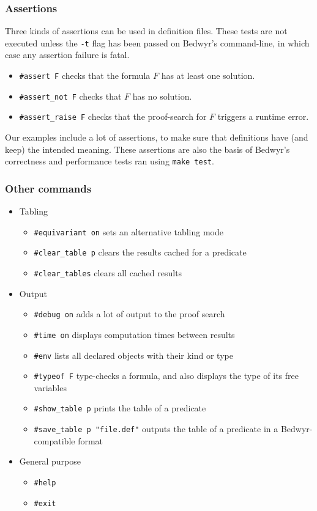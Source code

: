 \documentclass{article}
\begin{document}
\subsubsection{Assertions}

Three kinds of assertions can be used in definition files.
These tests are not executed unless the \verb.-t. flag has been passed
on Bedwyr's command-line, in which case any assertion failure is fatal.
\begin{itemize}
\item
\verb.#assert F. checks that the formula $F$ has at least one solution.
\item
\verb.#assert_not F. checks that $F$ has no solution.
\item
\verb.#assert_raise F. checks that the proof-search for $F$ triggers
a runtime error.
\end{itemize}

Our examples include a lot of assertions, to make sure that definitions have
(and keep) the intended meaning. These assertions are also the basis of
Bedwyr's correctness and performance tests ran using \verb.make test..

\subsubsection{Other commands}
\begin{itemize}
  \item Tabling
    \begin{itemize}
      \item \verb.#equivariant on. sets an alternative tabling mode
      \item \verb.#clear_table p. clears the results cached for a
        predicate
      \item \verb.#clear_tables. clears all cached results
    \end{itemize}

  \item Output
    \begin{itemize}
      \item \verb.#debug on. adds a lot of output to the proof search
      \item \verb.#time on. displays computation times between results
      \item \verb.#env. lists all declared objects with their kind or
        type
      \item \verb.#typeof F. type-checks a formula, and also displays
        the type of its free variables
      \item \verb.#show_table p. prints the table of a predicate
      \item \verb+#save_table p "file.def"+ outputs the table of a
        predicate in a Bedwyr-compatible format
    \end{itemize}

  \item General purpose
    \begin{itemize}
      \item \verb.#help.
      \item \verb.#exit.
    \end{itemize}
\end{itemize}
\end{document}
